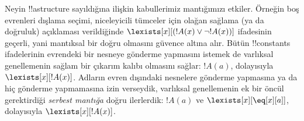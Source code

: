 \documentclass[../../../include/open-logic-section]{subfiles}
\begin{document}
\begin{digress}
Neyin !!a{structure} sayıldığına ilişkin kabullerimiz mantığımızı
etkiler. Örneğin boş evrenleri dışlama seçimi, niceleyicili tümceler
için olağan sağlama (ya da doğruluk) açıklaması verildiğinde
$\lexists[x][(!A(x)\lor\lnot !A(x))]$ ifadesinin geçerli, yani
mantıksal bir doğru olmasını güvence altına alır. Bütün !!{constant}s
ifadelerinin evrendeki bir nesneye gönderme yapmasını istemek de
varlıksal genellemenin sağlam bir çıkarım kalıbı olmasını sağlar:
$!A(a)$, dolayısıyla $\lexists[x][!A(x)]$. Adların evren dışındaki
nesnelere gönderme yapmasına ya da hiç gönderme yapmamasına izin
verseydik, varlıksal genellemenin ek bir öncül gerektirdiği
\emph{serbest mantığa} doğru ilerlerdik: $!A(a)$ ve
$\lexists[x][\eq[x][a]]$, dolayısıyla $\lexists[x][!A(x)]$.
\end{digress}
\end{document}
